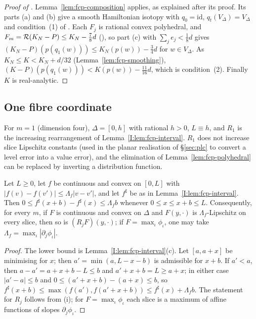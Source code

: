 \begin{proof}[Proof of ]
Lemma~\ref{lem:fcp-composition} applies, as explained after its proof. Its parts (a) and (b) give a smooth Hamiltonian
isotopy with $q_0=\mathrm{id}$, $q_t(V_\Delta)=V_\Delta$ and condition~(1) of . Each
$F_j$ is rational convex polyhedral, and $F_m=\mathcal{R}(K_N-P)\le K_N-\tfrac78d$ (),
so part (c) with $\sum_je_j<\tfrac18d$ gives $(K_N-P)(p(q_1(w)))\le K_N(p(w))-\tfrac34d$ for $w\in V_\Delta$. As
$K_N\le K<K_N+d/32$ (Lemma~\ref{lem:fcp-smoothing}), $(K-P)(p(q_1(w)))<K(p(w))-\tfrac{11}{16}d$, which is
condition~(2). Finally $K$ is real-analytic.
\end{proof}

\subsection{One fibre coordinate}\label{sec:fcp-one}

For $m=1$ (dimension four), $\Delta=[0,h]$ with rational $h>0$, $L\equiv h$, and $R_1$ is the increasing rearrangement of Lemma~\ref{I:lem:fcp-interval}. $R_1$ does not increase slice Lipschitz constants (used in the planar realisation of \S\ref{sec:plc} to convert a level error into a value error), and the elimination of Lemma~\ref{lem:fcp-polyhedral} can be replaced by inverting a distribution function.

\begin{lemma}\label{lem:fcp-lipschitz}
Let $L\ge0$, let $f$ be continuous and convex on $[0,L]$ with $|f(v)-f(v')|\le\Lambda_f|v-v'|$, and let $f^\sharp$ be
as in Lemma~\ref{I:lem:fcp-interval}. Then $0\le f^\sharp(x+b)-f^\sharp(x)\le\Lambda_fb$ whenever $0\le x\le x+b\le L$.
Consequently, for every $m$, if $F$ is continuous and convex on $\Delta$ and $F(y,\cdot)$ is $\Lambda_f$-Lipschitz on
every slice, then so is $(R_jF)(y,\cdot)$; if $F=\max_\iota\phi_\iota$, one may take
$\Lambda_f=\max_\iota|\partial_j\phi_\iota|$.
\end{lemma}

\begin{proof}
The lower bound is Lemma~\ref{I:lem:fcp-interval}(c). Let $[a,a+x]$ be minimising for $x$; then $a'=\min(a,L-x-b)$ is admissible for $x+b$. If $a'<a$, then $a-a'=a+x+b-L\le b$ and $a'+x+b=L\ge a+x$; in either case $|a'-a|\le b$ and $0\le(a'+x+b)-(a+x)\le b$, so $f^\sharp(x+b)\le\max(f(a'),f(a'+x+b))\le f^\sharp(x)+\Lambda_fb$. The statement for $R_j$ follows from (i); for $F=\max_\iota\phi_\iota$ each slice is a maximum of affine functions of slopes $\partial_j\phi_\iota$.
\end{proof}

